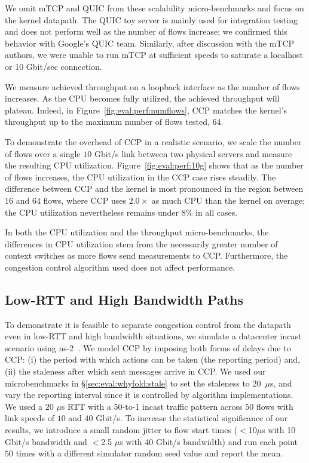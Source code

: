 We omit mTCP and QUIC from these scalability micro-benchmarks and focus on the kernel datapath. The QUIC toy server is mainly used for integration testing and does not perform well as the number of flows increase; we confirmed this behavior with Google's QUIC team. Similarly, after discussion with the mTCP authors, we were unable to run mTCP at sufficient speeds to saturate a localhost or 10 Gbit/sec connection.

 We measure achieved throughput on a loopback interface as the number of flows increases. As the CPU becomes fully utilized, the achieved throughput will plateau. Indeed, in Figure~\ref{fig:eval:perf:numflows}, CCP matches the kernel's throughput up to the maximum number of flows tested, 64. 

 To demonstrate the overhead of CCP in a realistic scenario, we scale the number of flows over a single $10$ Gbit/s link between two physical servers and measure the resulting CPU utilization.
Figure~\ref{fig:eval:perf:10g} shows that as the number of flows increases, the CPU utilization in the CCP case rises steadily. The difference between CCP and the kernel is most pronounced in the region between $16$ and $64$ flows, where CCP uses $2.0\times$ as much CPU than the kernel on average; the CPU utilization nevertheless remains under 8\% in all cases.

In both the CPU utilization and the throughput micro-benchmarks, the differences in CPU utilization stem from the necessarily greater number of context switches as more flows send measurements to CCP. Furthermore, the congestion control algorithm used does not affect performance.

\subsection{Low-RTT and High Bandwidth Paths}
\label{sec:eval:lowrtt}

To demonstrate it is feasible to separate congestion control from the datapath even in low-RTT and high bandwidth situations, we simulate a datacenter incast scenario using ns-2~\cite{ns2}.
We model CCP by imposing both forms of delays due to CCP: (i) the period with which actions can be taken (the reporting period) and, (ii) the staleness after which sent messages arrive in CCP. We used our microbenchmarks in \S\ref{sec:eval:whyfold:stale} to set the staleness to 20~$\mu$s, and vary the reporting interval since it is controlled by algorithm implementations. 
We used a $20$ $\mu$s RTT with a 50-to-1 incast traffic pattern across $50$ flows with link speeds of $10$ and $40$ Gbit/s. To increase the statistical significance of our results, we introduce a small random jitter to flow start times ($<$10$ \mu$s with 10 Gbit/s bandwidth and $<$2.5 $\mu$s with 40 Gbit/s bandwidth) and run each point $50$ times with a different simulator random seed value and report the mean.

